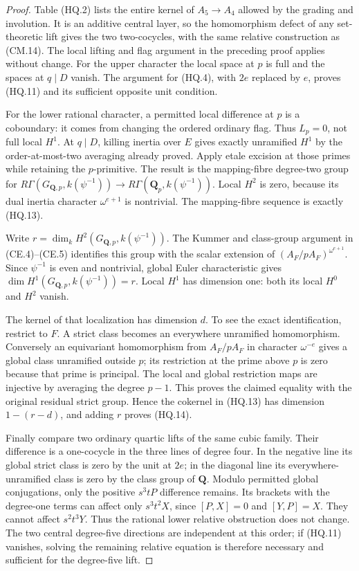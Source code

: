 \begin{proof}
Table (HQ.2) lists the entire kernel of
\(A_5\to A_4\) allowed by the grading and involution.
It is an additive central layer, so the homomorphism
defect of any set-theoretic lift gives the two
two-cocycles, with the same relative construction
as (CM.14).  The local lifting and flag argument
in the preceding proof applies without change.
For the upper character the local space at \(p\)
is full and the spaces at \(q\mid D\) vanish.
The argument for (HQ.4), with \(2e\) replaced by
\(e\), proves (HQ.11) and its sufficient opposite
unit condition.

For the lower rational character, a permitted
local difference at \(p\) is a coboundary: it
comes from changing the ordered ordinary flag.
Thus \(L_p=0\), not full local \(H^1\).
At \(q\mid D\), killing inertia over \(E\)
gives exactly unramified \(H^1\) by the
order-at-most-two averaging already proved.
Apply etale excision at those primes while
retaining the \(p\)-primitive.  The result is
the mapping-fibre degree-two group for
\(R\Gamma(G_{\mathbf Q,p},k(\psi^{-1}))\to
R\Gamma(\mathbf Q_p,k(\psi^{-1}))\).
Local \(H^2\) is zero, because its dual inertia
character \(\omega^{e+1}\) is nontrivial.
The mapping-fibre sequence is exactly (HQ.13).

Write \(r=\dim_k H^2(G_{\mathbf Q,p},k(\psi^{-1}))\).
The Kummer and class-group argument in (CE.4)--(CE.5)
identifies this group with the scalar extension of
\((A_F/pA_F)^{\omega^{e+1}}\).
Since \(\psi^{-1}\) is even and nontrivial,
global Euler characteristic gives
\(\dim H^1(G_{\mathbf Q,p},k(\psi^{-1}))=r\).
Local \(H^1\) has dimension one: both its
local \(H^0\) and \(H^2\) vanish.

The kernel of that localization has dimension
\(d\).  To see the exact identification, restrict
to \(F\).  A strict class becomes an everywhere
unramified homomorphism.  Conversely an equivariant
homomorphism from \(A_F/pA_F\) in character
\(\omega^{-e}\) gives a global class unramified
outside \(p\); its restriction at the prime above
\(p\) is zero because that prime is principal.
The local and global restriction maps are
injective by averaging the degree \(p-1\).
This proves the claimed equality with the
original residual strict group.  Hence the
cokernel in (HQ.13) has dimension \(1-(r-d)\),
and adding \(r\) proves (HQ.14).

Finally compare two ordinary quartic lifts of
the same cubic family.  Their difference is
a one-cocycle in the three lines of degree four.
In the negative line its global strict class
is zero by the unit at \(2e\); in the diagonal
line its everywhere-unramified class is zero
by the class group of \(\mathbf Q\).
Modulo permitted global conjugations, only
the positive \(s^3tP\) difference remains.
Its brackets with the degree-one terms can
affect only \(s^3t^2X\), since
\([P,X]=0\) and \([Y,P]=X\).
They cannot affect \(s^2t^3Y\).
Thus the rational lower relative obstruction
does not change.  The two central degree-five
directions are independent at this order;
if (HQ.11) vanishes, solving the remaining
relative equation is therefore necessary
and sufficient for the degree-five lift.
\end{proof}


